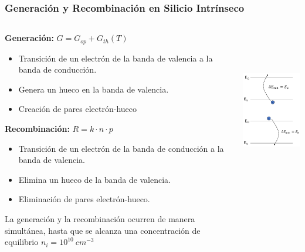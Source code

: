 \documentclass[10pt,t,aspectratio=169]{beamer}
\begin{document}
\begin{frame}[t]
    \frametitle{Generación y Recombinación en Silicio Intrínseco}

    \begin{columns}
    
        \begin{column}{0.5\textwidth}
        
            \textbf{Generación:} $G = G_{op} + G_{th}(T) $
            \begin{itemize}
                \item Transición de un electrón de la banda de valencia a la banda de conducción.
                \item Genera un hueco en la banda de valencia.
                \item Creación de pares electrón-hueco
            \end{itemize}
            
            \vspace{3mm}
            \textbf{Recombinación:} $R = k\cdot{}n\cdot{}p$
            \begin{itemize}
                \item Transición de un electrón de la banda de conducción a la banda de valencia.
                \item Elimina un hueco de la banda de valencia.
                \item Eliminación de pares electrón-hueco.
            \end{itemize}

            \vspace{3mm}
            \centering
            La generación y la recombinación ocurren de manera simultánea, hasta que se alcanza una concentración de equilibrio $n_i=10^{10}\ cm^{-3}$
            
        \end{column}
        
        \begin{column}{0.5\textwidth}
        
            \centering
            \includegraphics[height=7cm]{./figures/generacion-recombinacion.pdf}
            
        \end{column}
        
    \end{columns}
    
\end{frame}
\end{document}
